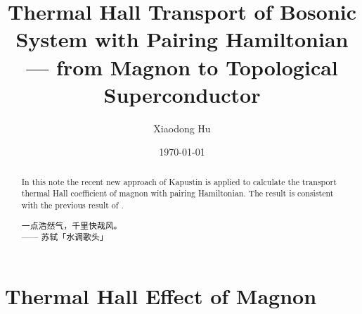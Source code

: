 \documentclass[10pt,nofootinbib]{revtex4}
\begin{document}
\title{Thermal Hall Transport of Bosonic System with Pairing Hamiltonian --- from Magnon to Topological Superconductor}
\author{Xiaodong Hu}

\date{\today}

\begin{abstract}
	In this note the recent new approach of Kapustin \cite{kapustin2019thermal} is applied to calculate the transport thermal Hall coefficient of magnon with pairing Hamiltonian. The result is consistent with the previous result of \cite{matsumoto2014thermal}.\par
		\hfill\par
		{\centering\kaishu 一点浩然气，千里快哉风。\\[0.5em]}
	\hfill------ 苏轼「水调歌头」
\end{abstract}

\maketitle
\tableofcontents


\section{Thermal Hall Effect of Magnon}
\end{document}
